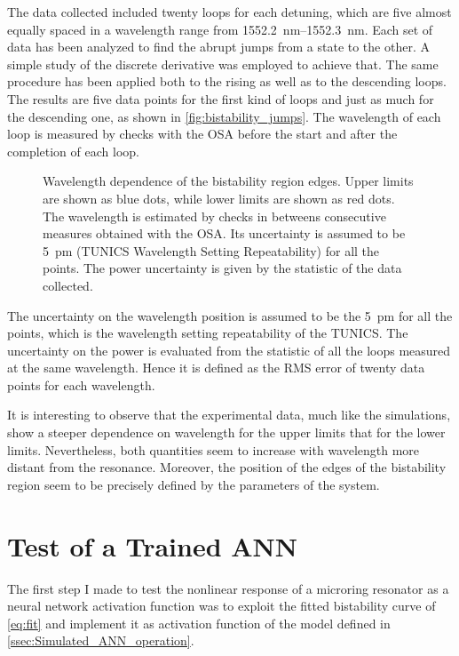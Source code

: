 The data collected included twenty loops for each detuning, which are five almost equally spaced in a wavelength range from \SIrange{1552.2}{1552.3}{\nm}.
Each set of data has been analyzed to find the abrupt jumps from a state to the other.
A simple study of the discrete derivative was employed to achieve that.
The same procedure has been applied both to the rising as well as to the descending loops.
The results are five data points for the first kind of loops and just as much for the descending one, as shown in \autoref{fig:bistability_jumps}.
The wavelength of each loop is measured by checks with the \acs{OSA} before the start and after the completion of each loop.

\begin{figure}[!hbtp]
	\centering
	
	\caption{Wavelength dependence of the bistability region edges.
		Upper limits are shown as blue dots, while lower limits are shown as red dots.
		The wavelength is estimated by checks in betweens consecutive measures obtained with the \acs{OSA}.
		Its uncertainty is assumed to be \SI{5}{\pm} (TUNICS Wavelength Setting Repeatability) for all the points.
		The power uncertainty is given by the statistic of the data collected. %
	}
	\label{fig:bistability_jumps}
\end{figure}

The uncertainty on the wavelength position is assumed to be the \SI{5}{\pm} for all the points, which is the wavelength setting repeatability of the TUNICS.
The uncertainty on the power is evaluated from the statistic of all the loops measured at the same wavelength.
Hence it is defined as the RMS error of twenty data points for each wavelength.

It is interesting to observe that the experimental data, much like the simulations, show a steeper dependence on wavelength for the upper limits that for the lower limits.
Nevertheless, both quantities seem to increase with wavelength more distant from the resonance.
Moreover, the position of the edges of the bistability region seem to be precisely defined by the parameters of the system.

\section{Test of a Trained ANN}
\label{sec:Test_of_a_Trained ANN}
The first step I made to test the nonlinear response of a microring resonator as a neural network activation function was to exploit the fitted bistability curve of \autoref{eq:fit} and implement it as activation function of the model defined in \autoref{ssec:Simulated_ANN_operation}.

